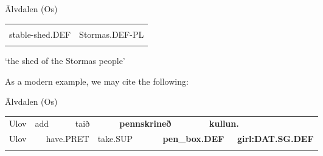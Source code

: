 \begin{listWWNumileveli}
\item 

\begin{styleExample}
Älvdalen (Os)

\end{styleExample}

\end{listWWNumileveli}

\begin{tabular}{ll}
\lsptoprule
\multicolumn{2}{l}{fjosbuðę

}\\
stable-shed.DEF & Stormas.DEF-PL\\
\lspbottomrule
\end{tabular}

\begin{styleTranslation}
‘the shed of the Stormas people’

\end{styleTranslation}

\begin{styleBodyTextFirst}
As a modern example, we may cite the following:

\end{styleBodyTextFirst}

\begin{listWWNumileveli}
\item 

\begin{styleExample}
Älvdalen (Os)

\end{styleExample}

\end{listWWNumileveli}

\begin{tabular}{llllllllll}
\lsptoprule
Ulov & \multicolumn{2}{l}{add

} & \multicolumn{2}{l}{taið

} & \multicolumn{2}{l}{{\bfseries pennskrineð}

} & \multicolumn{2}{l}{{\bfseries kullun.}

} & \\
\multicolumn{2}{l}{Ulov

} & \multicolumn{2}{l}{have.PRET

} & \multicolumn{2}{l}{take.SUP

} & \multicolumn{2}{l}{{\bfseries pen\_box.DEF}

} & \multicolumn{2}{l}{{\bfseries girl:DAT.SG.DEF}

}\\
\lspbottomrule
\end{tabular}

